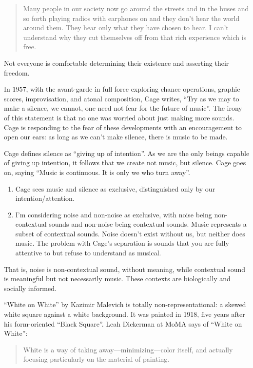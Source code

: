 \documentclass{thesis}
\begin{document}
\begin{quote}
	Many people in our society now go around the streets and in the buses and so forth playing radios with earphones on and they don't hear the world around them. They hear only what they have chosen to hear. I can't understand why they cut themselves off from that rich experience which is free.
\end{quote}

	Not everyone is comfortable determining their existence and asserting their freedom.
	
	In 1957, with the avant-garde in full force exploring chance operations, graphic scores, improvisation, and atonal composition, Cage writes, ``Try as we may to make a silence, we cannot, one need not fear for the future of music''. The irony of this statement is that no one was worried about just making more sounds. Cage is responding to the fear of these developments with an encouragement to open our ears: as long as we can't make silence, there is music to be made.
	
	Cage defines silence as ``giving up of intention''. As we are the only beings capable of giving up intention, it follows that we create not music, but silence. Cage goes on, saying ``Music is continuous. It is only we who turn away''.
	
\begin{enumerate}
	\item Cage sees music and silence as exclusive, distinguished only by our intention/attention.
	\item I'm considering noise and non-noise as exclusive, with noise being non-contextual sounds and non-noise being contextual sounds. Music represents a subset of contextual sounds. Noise doesn't exist without us, but neither does music. The problem with Cage's separation is sounds that you are fully attentive to but refuse to understand as musical.
\end{enumerate}

That is, noise is non-contextual sound, without meaning, while contextual sound is meaningful but not necessarily music. These contexts are biologically and socially informed.

``White on White'' by Kazimir Malevich is totally non-representational: a skewed white square against a white background. It was painted in 1918, five years after his form-oriented ``Black Square''. Leah Dickerman at MoMA says of ``White on White''\cite{moma_kazimir_2006}:
	
	\begin{quote}
	White is a way of taking away---minimizing---color itself, and actually focusing particularly on the material of painting.
	\end{quote}
	
\end{document}
